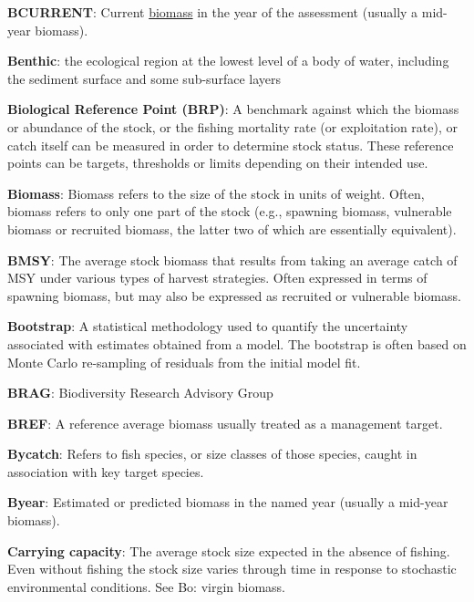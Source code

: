 \documentclass{mpi-plenary}
\theoremstyle{definition}
\theoremstyle{definition}
\theoremstyle{definition}
\theoremstyle{remark}
\begin{document}
\protect\hypertarget{def-bcurrent}{}{} \textbf{BCURRENT}: Current
\protect\hyperlink{def-biomass}{biomass} in the year of the assessment
(usually a mid-year biomass).

\protect\hypertarget{def-benthic}{}{} \textbf{Benthic}: the ecological
region at the lowest level of a body of water, including the sediment
surface and some sub-surface layers

\protect\hypertarget{def-brp}{}{} \textbf{Biological Reference Point
(BRP)}: A benchmark against which the biomass or abundance of the stock,
or the fishing mortality rate (or exploitation rate), or catch itself
can be measured in order to determine stock status. These reference
points can be targets, thresholds or limits depending on their intended
use.

\protect\hypertarget{def-biomass}{}{} \textbf{Biomass}: Biomass refers
to the size of the stock in units of weight. Often, biomass refers to
only one part of the stock (e.g., spawning biomass, vulnerable biomass
or recruited biomass, the latter two of which are essentially
equivalent).

\protect\hypertarget{def-bmsy}{}{} \textbf{BMSY}: The average stock
biomass that results from taking an average catch of MSY under various
types of harvest strategies. Often expressed in terms of spawning
biomass, but may also be expressed as recruited or vulnerable biomass.

\protect\hypertarget{def-bootstrap}{}{} \textbf{Bootstrap}: A
statistical methodology used to quantify the uncertainty associated with
estimates obtained from a model. The bootstrap is often based on Monte
Carlo re-sampling of residuals from the initial model fit.

\protect\hypertarget{def-brag}{}{} \textbf{BRAG}: Biodiversity Research
Advisory Group

\protect\hypertarget{def-bref}{}{} \textbf{BREF}: A reference average
biomass usually treated as a management target.

\protect\hypertarget{def-bycatch}{}{} \textbf{Bycatch}: Refers to fish
species, or size classes of those species, caught in association with
key target species.

\protect\hypertarget{def-byear}{}{} \textbf{Byear}: Estimated or
predicted biomass in the named year (usually a mid-year biomass).

\protect\hypertarget{def-carrying-capacity}{}{} \textbf{Carrying
capacity}: The average stock size expected in the absence of fishing.
Even without fishing the stock size varies through time in response to
stochastic environmental conditions. See Bo: virgin biomass.
\end{document}
